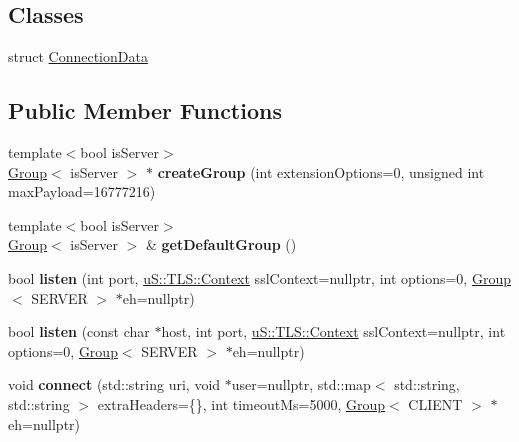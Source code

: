 \subsection*{Classes}
\begin{DoxyCompactItemize}
\item 
struct \mbox{\hyperlink{structu_w_s_1_1_hub_1_1_connection_data}{Connection\+Data}}
\end{DoxyCompactItemize}
\subsection*{Public Member Functions}
\begin{DoxyCompactItemize}
\item 
\mbox{\label{structu_w_s_1_1_hub_a1f98feae6a7a2f9247198a7358aa46e8}} 
{\footnotesize template$<$bool is\+Server$>$ }\\\mbox{\hyperlink{structu_w_s_1_1_group}{Group}}$<$ is\+Server $>$ $\ast$ {\bfseries create\+Group} (int extension\+Options=0, unsigned int max\+Payload=16777216)
\item 
\mbox{\label{structu_w_s_1_1_hub_a49767f65b297dda718828d7c51bf783a}} 
{\footnotesize template$<$bool is\+Server$>$ }\\\mbox{\hyperlink{structu_w_s_1_1_group}{Group}}$<$ is\+Server $>$ \& {\bfseries get\+Default\+Group} ()
\item 
\mbox{\label{structu_w_s_1_1_hub_a2066421be36412df352a2f8d19a40f2a}} 
bool {\bfseries listen} (int port, \mbox{\hyperlink{classu_s_1_1_t_l_s_1_1_context}{u\+S\+::\+T\+L\+S\+::\+Context}} ssl\+Context=nullptr, int options=0, \mbox{\hyperlink{structu_w_s_1_1_group}{Group}}$<$ S\+E\+R\+V\+ER $>$ $\ast$eh=nullptr)
\item 
\mbox{\label{structu_w_s_1_1_hub_afeabd683111877401446176ed6fa2168}} 
bool {\bfseries listen} (const char $\ast$host, int port, \mbox{\hyperlink{classu_s_1_1_t_l_s_1_1_context}{u\+S\+::\+T\+L\+S\+::\+Context}} ssl\+Context=nullptr, int options=0, \mbox{\hyperlink{structu_w_s_1_1_group}{Group}}$<$ S\+E\+R\+V\+ER $>$ $\ast$eh=nullptr)
\item 
\mbox{\label{structu_w_s_1_1_hub_a15390dc9da51c0c00d3d05585b541be0}} 
void {\bfseries connect} (std\+::string uri, void $\ast$user=nullptr, std\+::map$<$ std\+::string, std\+::string $>$ extra\+Headers=\{\}, int timeout\+Ms=5000, \mbox{\hyperlink{structu_w_s_1_1_group}{Group}}$<$ C\+L\+I\+E\+NT $>$ $\ast$eh=nullptr)

\end{DoxyCompactItemize}
